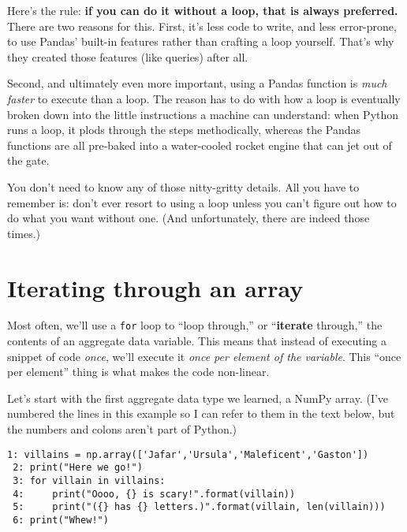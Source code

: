 Here's the rule: \textbf{if you can do it without a loop, that is always
preferred.} There are two reasons for this. First, it's less code to write, and
less error-prone, to use Pandas' built-in features rather than crafting a loop
yourself. That's why they created those features (like queries) after all.

Second, and ultimately even more important, using a Pandas function is
\textit{much faster} to execute than a loop. The reason has to do with how a
loop is eventually broken down into the little instructions a machine can
understand: when Python runs a loop, it plods through the steps methodically,
whereas the Pandas functions are all pre-baked into a water-cooled rocket
engine that can jet out of the gate.

You don't need to know any of those nitty-gritty details. All you have to
remember is: don't ever resort to using a loop unless you can't figure out how
to do what you want without one. (And unfortunately, there are indeed those
times.)

\section{Iterating through an array}


Most often, we'll use a \texttt{for} loop to ``loop through,'' or
``\textbf{iterate} through,'' the contents of an aggregate data variable. This
means that instead of executing a snippet of code \textit{once}, we'll execute
it \textit{once per element of the variable}. This ``once per element'' thing
is what makes the code non-linear.


Let's start with the first aggregate data type we learned, a NumPy array.
(I've numbered the lines in this example so I can refer to them in the text
below, but the numbers and colons aren't part of Python.)

\begin{Verbatim}[fontsize=\small,samepage=true,frame=single,framesep=3mm]
 1: villains = np.array(['Jafar','Ursula','Maleficent','Gaston'])
 2: print("Here we go!")
 3: for villain in villains:
 4:     print("Oooo, {} is scary!".format(villain))
 5:     print("({} has {} letters.)".format(villain, len(villain)))
 6: print("Whew!")
\end{Verbatim}


